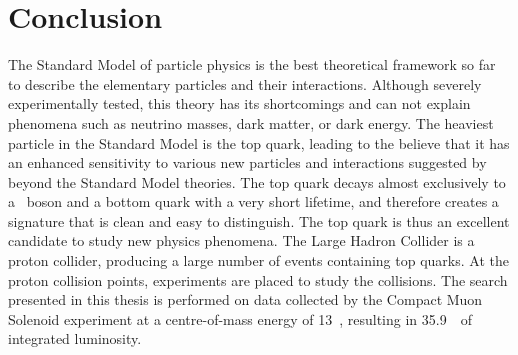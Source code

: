 \section{Conclusion}
The Standard Model of particle physics is the best theoretical framework so far to describe the elementary particles and their interactions. Although severely experimentally tested, this theory has its shortcomings and can not explain phenomena such as neutrino masses, dark matter, or dark energy. The heaviest particle in the Standard Model is the top quark, leading to the believe that it has an enhanced sensitivity to various new particles and interactions suggested by beyond the Standard Model theories. The top quark decays almost exclusively to a \PW\ boson and a bottom quark with a very short lifetime, and therefore creates a signature that is clean and easy to distinguish. The top quark is thus an excellent candidate to study new physics phenomena. The Large Hadron Collider is a proton collider, producing a large number of events containing top quarks. At the proton collision points, experiments are placed to study the collisions. The search presented in this thesis is performed on data collected by the Compact Muon Solenoid experiment at a centre-of-mass energy of 13~\TeV, resulting in 35.9~\fbinv\ of integrated luminosity. 


